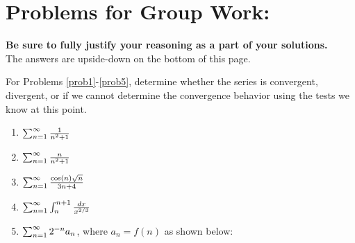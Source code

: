 \section*{Problems for Group Work:}
\textbf{Be sure to fully justify your reasoning as a part of your solutions.}\\
 The answers are upside-down on the bottom of this page.

For Problems \ref{prob1}-\ref{prob5}, determine whether the series is convergent, divergent, or if we cannot determine the convergence behavior using the tests we know at this point.

\begin{enumerate}


\item \(\sum_{n=1}^\infty \frac{1}{n^2+1}\) \label{prob1}
\vspace*{.5in}

\item \(\sum_{n=1}^\infty \frac{n}{n^2+1}\) \label{prob2}
\vspace*{.5in}

\item \(\sum_{n=1}^\infty \frac{\cos(n)\sqrt{n}}{3n+4}\) \label{prob3}
\vspace*{.5in}

\item \(\sum_{n=1}^\infty \int_{n}^{n+1} \frac{dx}{x^{2/3}}\) \label{prob4}
\vspace*{.5in}

\item \(\sum_{n=1}^\infty 2^{-n} a_n\), where \(a_n = f(n)\) as shown below: \label{prob5}

\end{enumerate}
